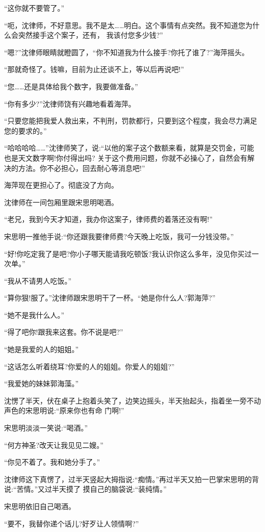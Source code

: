 \documentclass[11pt,a4paper,onecolumn]{article}
\begin{document}
``这你就不要管了。''

``呃，沈律师，不好意思。我不是太……明白。这个事情有点突然。我不知道您为什么会突然接手这个案子，还有，
我该付您多少钱?''

``嗯?''沈律师眼睛就瞪圆了，``你不知道我为什么接手?你托了谁了?''海萍摇头。

``那就奇怪了。钱嘛，目前为止还谈不上，等以后再说吧!''

``您……还是具体给我个数字，我要做准备。''

``你有多少?''沈律师饶有兴趣地看着海萍。

``只要您能把我爱人救出来，不判刑，罚款都行，只要到这个程度，我会尽力满足您的要求的。''

``哈哈哈哈……''沈律师笑了，说:``以他的案子这个数额来看，就算是交罚金，可能也是天文数字啊!你付得出吗?
关于这个费用问题，你就不必操心了，自然会有解决的方法。你不必担心，回去耐心等消息吧!''

海萍现在更担心了。彻底没了方向。

沈律师在一间包厢里跟宋思明喝酒。

``老兄，我到今天才知道，我办你这案子，律师费的着落还没有啊!''

宋思明一推他手说:``你还跟我要律师费?今天晚上吃饭，我可一分钱没带。''

``好!你吃定我了是吧?你小子哪天能请我吃顿饭?我认识你这么多年，没见你买过一次单。''

``我从不请男人吃饭。''

``算你狠!服了。''沈律师跟宋思明干了一杯。``她是你什么人?郭海萍?''

``她不是我什么人。''

``得了吧你!跟我来这套。你不说是吧?''

``她是我爱的人的姐姐。''

``这话怎么听着绕耳?你爱的人的姐姐。你爱人的姐姐?''

``我爱她的妹妹郭海藻。''

沈愣了半天，伏在桌子上抱着头笑了，边笑边摇头，半天抬起头，指着坐一旁不动声色的宋思明说:``原来你也有命
门啊!''

宋思明淡淡一笑说:``喝酒。''

``何方神圣?改天让我见见二嫂。''

``你见不着了。我和她分手了。''

沈律师这下真愣了，过半天竖起大拇指说:``痴情。''再过半天又拍一巴掌宋思明的背说:``苦情。''又过半天摸了
摸自己的脑袋说:``装纯情。''

宋思明依旧自己喝酒。

``要不，我替你递个话儿?好歹让人领情啊?''
\end{document}
